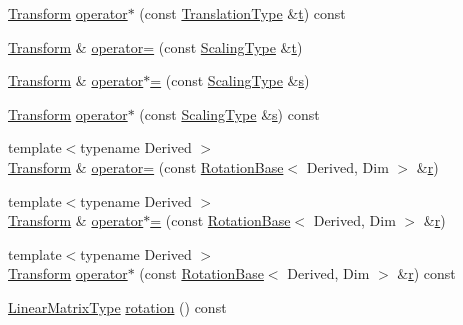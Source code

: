 \begin{DoxyCompactItemize}
\item 
\hyperlink{class_transform}{Transform} \hyperlink{class_transform_a678bf60047a60b0ef9ce4cfae56a2091}{operator$\ast$} (const \hyperlink{class_transform_adc0ae33868e7f2d468acc92d2d4c4b80}{Translation\-Type} \&\hyperlink{glext_8h_a00140d6f5c548b26daf170bf16e86a6d}{t}) const 
\item 
\hyperlink{class_transform}{Transform} \& \hyperlink{class_transform_a5f4d5e717574a7c63abfa91e7771652b}{operator=} (const \hyperlink{class_transform_a4b7ae3ae58b92b27215b3eed30fde503}{Scaling\-Type} \&\hyperlink{glext_8h_a00140d6f5c548b26daf170bf16e86a6d}{t})
\item 
\hyperlink{class_transform}{Transform} \& \hyperlink{class_transform_a830bdffe9c7bb3a838352cbf6ae1b6fd}{operator$\ast$=} (const \hyperlink{class_transform_a4b7ae3ae58b92b27215b3eed30fde503}{Scaling\-Type} \&\hyperlink{glext_8h_ad585a1393cfa368fa9dc3d8ebff640d5}{s})
\item 
\hyperlink{class_transform}{Transform} \hyperlink{class_transform_ace8cdc80e2ac6879645cb8b9c6d185f9}{operator$\ast$} (const \hyperlink{class_transform_a4b7ae3ae58b92b27215b3eed30fde503}{Scaling\-Type} \&\hyperlink{glext_8h_ad585a1393cfa368fa9dc3d8ebff640d5}{s}) const 
\item 
{\footnotesize template$<$typename Derived $>$ }\\\hyperlink{class_transform}{Transform} \& \hyperlink{class_transform_abadade903a2f2de1ac487ecce8081d77}{operator=} (const \hyperlink{class_rotation_base}{Rotation\-Base}$<$ Derived, Dim $>$ \&\hyperlink{glext_8h_abe08814c2f72843fde4d8df41440d5a0}{r})
\item 
{\footnotesize template$<$typename Derived $>$ }\\\hyperlink{class_transform}{Transform} \& \hyperlink{class_transform_a8290c2f698379a58bbb0a7f0d9d2caa7}{operator$\ast$=} (const \hyperlink{class_rotation_base}{Rotation\-Base}$<$ Derived, Dim $>$ \&\hyperlink{glext_8h_abe08814c2f72843fde4d8df41440d5a0}{r})
\item 
{\footnotesize template$<$typename Derived $>$ }\\\hyperlink{class_transform}{Transform} \hyperlink{class_transform_ad98a5988f7b06dcd01dc006db9b2c59a}{operator$\ast$} (const \hyperlink{class_rotation_base}{Rotation\-Base}$<$ Derived, Dim $>$ \&\hyperlink{glext_8h_abe08814c2f72843fde4d8df41440d5a0}{r}) const 
\item 
\hyperlink{class_transform_ac41e348fcbe528edca0c5e8b1954ba87}{Linear\-Matrix\-Type} \hyperlink{class_transform_a3d5324a4905c6c83465ae72afbdcf947}{rotation} () const 

\end{DoxyCompactItemize}
